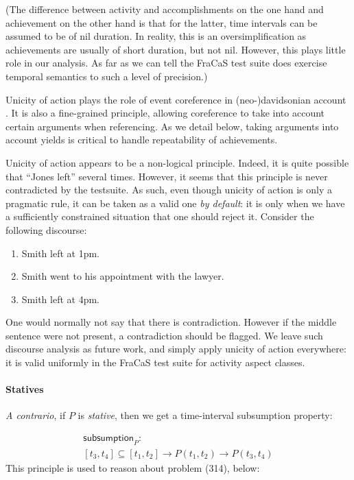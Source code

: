 \documentclass[a4paper,11pt]{article}
\newcommand\constant[1]{\mathsf{#1}}
\begin{document}
(The difference between activity and accomplishments on the one hand and
achievement on the other hand is that for the latter, time intervals
can be assumed to be of nil duration. In reality, this is an
oversimplification as achievements are usually of short duration, but
not nil. However, this plays little role in our
analysis. As far as we can tell the FraCaS test suite does exercise temporal semantics to
such a level of precision.)

Unicity of action plays the role of event coreference in
(neo-)davidsonian account . It is also a fine-grained
principle, allowing coreference to take into account certain arguments
when referencing. As we detail below, taking arguments into account
yields is critical to handle repeatability of achievements.

Unicity of action appears to be a non-logical principle. Indeed, it is
quite possible that ``Jones left'' several times. However, it seems
that this principle is never contradicted by the testsuite. As such,
even though unicity of action is only a pragmatic rule, it can be
taken as a valid one \emph{by default}: it is only when we have a
sufficiently constrained situation that one should reject it. Consider
the following discourse:
\begin{enumerate}[parsep=0pt,itemsep=1pt,label=(\arabic*)]
\item Smith left at 1pm.
\item Smith went to his appointment with the lawyer.
\item Smith left at 4pm.
\end{enumerate}
One would normally not say that there is contradiction. However if the
middle sentence were not present, a contradiction should be
flagged. We leave such discourse analysis as future work, and simply
apply unicity of action everywhere: it is valid uniformly in the
FraCaS test suite for activity aspect classes.


\paragraph{Statives}
\textit{A contrario}, if \(P\) is \emph{stative}, then we get a time-interval subsumption property:

\begin{multline*}
\constant {subsumption}_P :\\ [t_3,t_4] ⊆ [t_1,t_2] → P (t_1,t_2) → P (t_3,t_4)
\end{multline*}
This principle is used to reason about problem (314), below:
\end{document}
